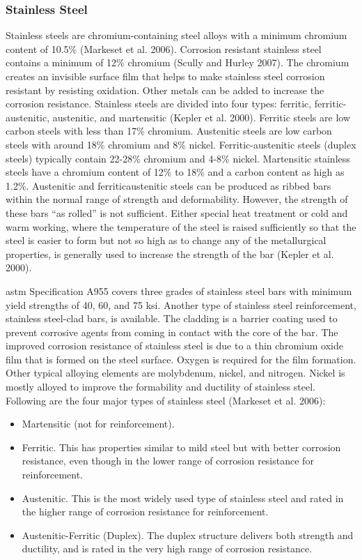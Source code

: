 \subsubsection{Stainless Steel}
Stainless steels are chromium-containing steel alloys with a minimum chromium content of 10.5\% (Markeset et
al. 2006). Corrosion resistant stainless steel contains a minimum of 12\% chromium (Scully and Hurley 2007). The
chromium creates an invisible surface film that helps to make stainless steel corrosion resistant by resisting
oxidation. Other metals can be added to increase the corrosion resistance. Stainless steels are divided into four
types: ferritic, ferritic-austenitic, austenitic, and martensitic (Kepler et al. 2000). Ferritic steels are low carbon steels
with less than 17\% chromium. Austenitic steels are low carbon steels with around 18\% chromium and 8\% nickel.
Ferritic-austenitic steels (duplex steels) typically contain 22-28\% chromium and 4-8\% nickel. Martensitic stainless
steels have a chromium content of 12\% to 18\% and a carbon content as high as 1.2\%. Austenitic and ferriticaustenitic
steels can be produced as ribbed bars within the normal range of strength and deformability. However, the
strength of these bars “as rolled” is not sufficient. Either special heat treatment or cold and warm working, where the
temperature of the steel is raised sufficiently so that the steel is easier to form but not so high as to change any of the
metallurgical properties, is generally used to increase the strength of the bar (Kepler et al. 2000).

\acrshort*{astm} Specification A955 covers three grades of stainless steel bars with minimum yield strengths of 40, 60,
and 75 ksi. Another type of stainless steel reinforcement, stainless steel-clad bars, is available. The cladding is a
barrier coating used to prevent corrosive agents from coming in contact with the core of the bar. The improved
corrosion resistance of stainless steel is due to a thin chromium oxide film that is formed on the steel surface. Oxygen
is required for the film formation. Other typical alloying elements are molybdenum, nickel, and nitrogen. Nickel is
mostly alloyed to improve the formability and ductility of stainless steel. Following are the four major types of
stainless steel (Markeset et al. 2006):

\begin{itemize}
  \item Martensitic (not for reinforcement).
  \item Ferritic. This has properties similar to mild steel but with better corrosion resistance, even though in the lower range of corrosion resistance for reinforcement.
  \item Austenitic. This is the most widely used type of stainless steel and rated in the higher range of corrosion resistance for reinforcement.
  \item Austenitic-Ferritic (Duplex). The duplex structure delivers both strength and ductility, and is rated in the very high range of corrosion resistance.
\end{itemize}

